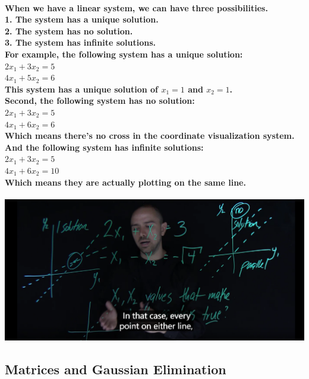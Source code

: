 \documentclass{article}
\begin{document}
\paragraph{When we have a linear system, we can have three possibilities.\\
1. The system has a unique solution.\\
2. The system has no solution.\\
3. The system has infinite solutions.\\
\hfill
For example, the following system has a unique solution:\\
$2x_1 + 3x_2 = 5$\\
$4x_1 + 5x_2 = 6$\\
This system has a unique solution of $x_1 = 1$ and $x_2 = 1$.\\
\hfill
Second, the following system has no solution:\\
$2x_1 + 3x_2 = 5$\\
$4x_1 + 6x_2 = 6$\\
Which means there's no cross in the coordinate visualization system.\\
\hfill
And the following system has infinite solutions:\\
$2x_1 + 3x_2 = 5$\\
$4x_1 + 6x_2 = 10$\\
Which means they are actually plotting on the same line.\\}

\includegraphics[width=\textwidth]{threesolutions}


\subsection{Matrices and Gaussian Elimination}
\end{document}
